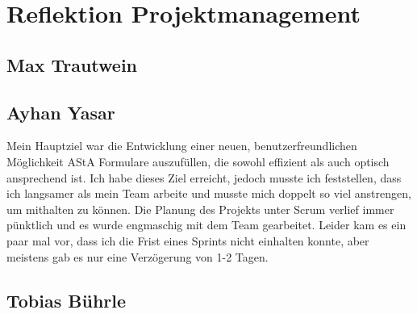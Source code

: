 \chapter{Reflektion Projektmanagement}\label{ch:reflektion-projektmanagement}


\section{Max Trautwein}


\section{Ayhan Yasar}
Mein Hauptziel war die Entwicklung einer neuen, benutzerfreundlichen Möglichkeit AStA Formulare auszufüllen, die sowohl effizient als auch optisch ansprechend ist. 
Ich habe dieses Ziel erreicht, jedoch musste ich feststellen, dass ich langsamer als mein Team arbeite und musste mich doppelt so viel anstrengen, um mithalten zu können.
Die Planung des Projekts unter Scrum verlief immer pünktlich und es wurde engmaschig mit dem Team gearbeitet. Leider kam es ein paar mal vor, dass ich die Frist eines Sprints nicht einhalten konnte, 
aber meistens gab es nur eine Verzögerung von 1-2 Tagen.

\section{Tobias Bührle}

